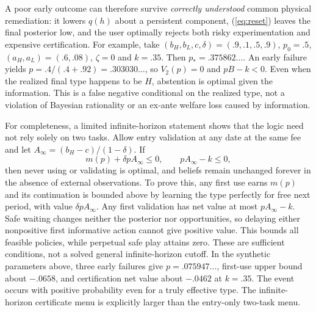 A poor early outcome can therefore survive \emph{correctly understood} common physical remediation: it lowers $q(h)$ about a persistent component, (\ref{eq:reset}) leaves the final posterior low, and the user optimally rejects both risky experimentation and expensive certification. For example, take $(b_H,b_L,c,\delta)=(.9,.1,.5,.9)$, $p_0=.5$, $(a_H,a_L)=(.6,.08)$, $\zeta=0$ and $k=.35$. Then $p_*=.375862\ldots$. An early failure yields $p=.4/(.4+.92)=.303030\ldots$, so $V_2(p)=0$ and $pB-k<0$. Even when the realized final type happens to be $H$, abstention is optimal given the information. This is a false negative conditional on the realized type, not a violation of Bayesian rationality or an ex-ante welfare loss caused by information.

For completeness, a limited infinite-horizon statement shows that the logic need not rely solely on two tasks. Allow entry validation at any date at the same fee and let $A_\infty=(b_H-c)/(1-\delta)$. If
\begin{equation}
 m(p)+\delta pA_\infty\leq0,\qquad pA_\infty-k\leq0,\label{eq:infbound}
\end{equation}
then never using or validating is optimal, and beliefs remain unchanged forever in the absence of external observations. To prove this, any first use earns $m(p)$ and its continuation is bounded above by learning the type perfectly for free next period, with value $\delta pA_\infty$. Any first validation has net value at most $pA_\infty-k$. Safe waiting changes neither the posterior nor opportunities, so delaying either nonpositive first informative action cannot give positive value. This bounds all feasible policies, while perpetual safe play attains zero. These are sufficient conditions, not a solved general infinite-horizon cutoff. In the synthetic parameters above, three early failures give $p=.075947\ldots$, first-use upper bound about $-.0658$, and certification net value about $-.0462$ at $k=.35$. The event occurs with positive probability even for a truly effective type. The infinite-horizon certificate menu is explicitly larger than the entry-only two-task menu.

